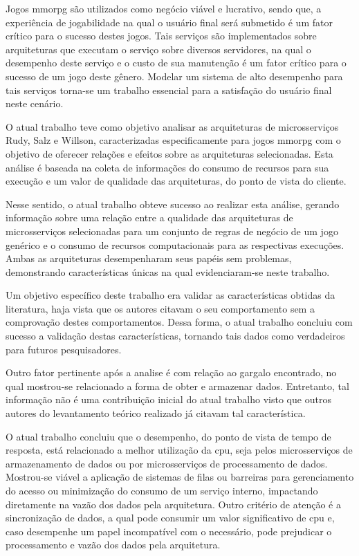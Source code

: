 


Jogos \ac{mmorpg} são utilizados como negócio viável e lucrativo, sendo que, a experiência de jogabilidade na qual o usuário final será submetido é um fator crítico para o sucesso destes jogos.
%
Tais serviços são implementados sobre arquiteturas que executam o serviço sobre diversos servidores, na qual o desempenho deste serviço e o custo de sua manutenção é um fator crítico para o sucesso de um jogo deste gênero.
%
Modelar um sistema de alto desempenho para tais serviços torna-se um trabalho essencial para a satisfação do usuário final neste cenário.


O atual trabalho teve como objetivo analisar as arquiteturas de microsserviços Rudy, Salz e Willson, caracterizadas especificamente para jogos \ac{mmorpg} com o objetivo de oferecer relações e efeitos sobre as arquiteturas selecionadas.
%
Esta análise é baseada na coleta de informações do consumo de recursos para sua execução e um valor de qualidade das arquiteturas, do ponto de vista do cliente.

Nesse sentido, o atual trabalho obteve sucesso ao realizar esta análise, gerando informação sobre uma relação entre a qualidade das arquiteturas de microsserviços selecionadas para um conjunto de regras de negócio de um jogo genérico e o consumo de recursos computacionais para as respectivas execuções.
%
Ambas as arquiteturas desempenharam seus papéis sem problemas, demonstrando características únicas na qual evidenciaram-se neste trabalho.

Um objetivo específico deste trabalho era validar as características obtidas da literatura, haja vista que os autores citavam o seu comportamento sem a comprovação destes comportamentos.
%
Dessa forma, o atual trabalho concluiu com sucesso a validação destas características, tornando tais dados como verdadeiros para futuros pesquisadores.

Outro fator pertinente após a analise é com relação ao gargalo encontrado, no qual mostrou-se relacionado a forma de obter e armazenar dados.
%
Entretanto, tal informação não é uma contribuição inicial do atual trabalho visto que outros autores do levantamento teórico realizado já citavam tal característica.

O atual trabalho concluiu que o desempenho, do ponto de vista de tempo de resposta, está relacionado a melhor utilização da \ac{cpu}, seja pelos microsserviços de armazenamento de dados ou por microsserviços de processamento de dados.
%
Mostrou-se viável a aplicação de sistemas de filas ou barreiras para gerenciamento do acesso ou minimização do consumo de um serviço interno, impactando diretamente na vazão dos dados pela arquitetura.
%
Outro critério de atenção é a sincronização de dados, a qual pode consumir um valor significativo de \ac{cpu} e, caso desempenhe um papel incompatível com o necessário, pode prejudicar o processamento e vazão dos dados pela arquitetura.

